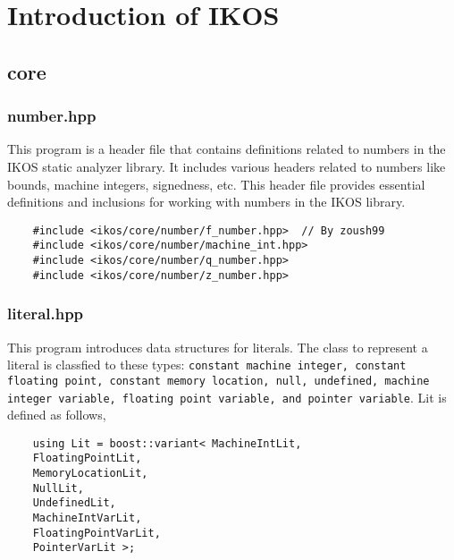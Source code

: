 \documentclass[12pt]{article}
\begin{document}
%

\rhead{\today}


\section{Introduction of IKOS}

\subsection{core}

\subsubsection{number.hpp}
This program is a header file that contains definitions related to numbers in the IKOS static analyzer library. It includes various headers related to numbers like bounds, machine integers, signedness, etc. This header file provides essential definitions and inclusions for working with numbers in the IKOS library.

\begin{lstlisting}
    #include <ikos/core/number/f_number.hpp>  // By zoush99
    #include <ikos/core/number/machine_int.hpp>
    #include <ikos/core/number/q_number.hpp>
    #include <ikos/core/number/z_number.hpp>
\end{lstlisting}

\subsubsection{literal.hpp}
This program introduces  data structures for literals. The class to represent a literal is classfied to these types: \texttt{constant machine integer, constant floating point, constant memory location, null, undefined, machine integer variable, floating point variable, and pointer variable}. Lit is defined as follows,
\begin{lstlisting}
    using Lit = boost::variant< MachineIntLit,
    FloatingPointLit,
    MemoryLocationLit,
    NullLit,
    UndefinedLit,
    MachineIntVarLit,
    FloatingPointVarLit,
    PointerVarLit >;
\end{lstlisting}
\end{document}
